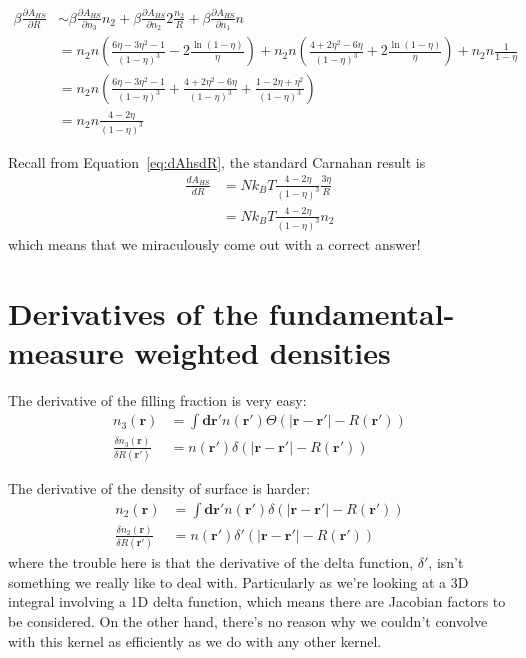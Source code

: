 \documentclass[letterpaper,twocolumn,amsmath,amssymb,jcp,10pt,aip]{revtex4-1}
\begin{document}
\begin{widetext}
\begin{align}
  \beta \frac{\partial A_{HS}}{\partial R} &\sim
    \beta \frac{\partial A_{HS}}{\partial n_3} n_2 +
    \beta \frac{\partial A_{HS}}{\partial n_2} 2 \frac{n_2}{R} +
    \beta \frac{\partial A_{HS}}{\partial n_1} n
  \\
  &=
    n_2n \left(
      \frac{6\eta - 3\eta^2 - 1}{(1-\eta)^3} -
      2\frac{\ln(1-\eta)}{\eta}
    \right) +
    n_2n \left( \frac{4+2\eta^2-6\eta}{(1-\eta)^3} + 2\frac{\ln(1-\eta)}{\eta} \right) +
    n_2n\frac{1}{1-\eta}
  \\
  &=
    n_2n \left(
      \frac{6\eta - 3\eta^2 - 1}{(1-\eta)^3} +
    \frac{4+2\eta^2-6\eta}{(1-\eta)^3} +
    \frac{1 - 2\eta + \eta^2}{(1-\eta)^3}
  \right)
  \\
  &=
    n_2n \frac{4 - 2\eta}{(1-\eta)^3}
\end{align}
\end{widetext}
Recall from Equation~\ref{eq:dAhsdR}, the standard Carnahan result is
\begin{align}
  \frac{dA_{HS}}{dR}
  &= Nk_BT \frac{4 - 2\eta}{(1-\eta)^3} \frac{3 \eta}{R}
  \\ &= Nk_BT \frac{4 - 2\eta}{(1-\eta)^3} n_2
\end{align}
which means that we miraculously come out with a correct answer!

\section{Derivatives of the fundamental-measure weighted densities}

The derivative of the filling fraction is very easy:
\begin{align}
  n_3(\mathbf{r}) &= \int \mathbf{dr'} n(\mathbf{r'})
  \Theta(|\mathbf{r}-\mathbf{r'}| - R(\mathbf{r'})) \\
  \frac{\delta n_3(\mathbf{r})}{\delta R(\mathbf{r}')}
  &= n(\mathbf{r'})\delta(|\mathbf{r}-\mathbf{r'}| - R(\mathbf{r'}))
\end{align}

The derivative of the density of surface is harder:
\begin{align}
  n_2(\mathbf{r}) &= \int \mathbf{dr'} n(\mathbf{r'})
  \delta(|\mathbf{r}-\mathbf{r'}| - R(\mathbf{r'})) \\
  \frac{\delta n_2(\mathbf{r})}{\delta R(\mathbf{r}')}
  &= n(\mathbf{r'})\delta'(|\mathbf{r}-\mathbf{r'}| - R(\mathbf{r'}))
\end{align}
where the trouble here is that the derivative of the delta function,
$\delta'$, isn't something we really like to deal with.  Particularly
as we're looking  at a 3D integral involving a 1D delta function,
which means there are Jacobian factors to be considered.  On the other
hand, there's no reason why we couldn't convolve with this kernel as
efficiently as we do with any other kernel.
\end{document}
